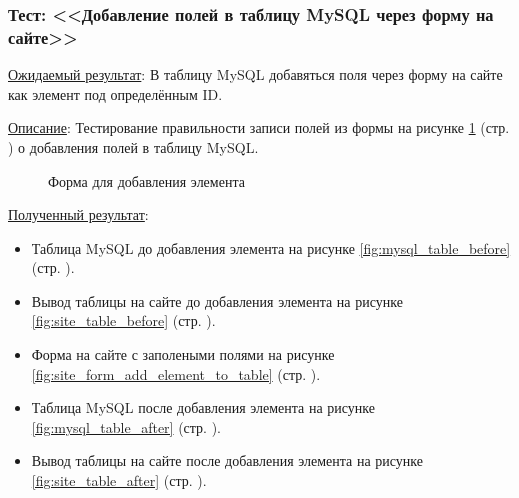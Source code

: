 \subsubsection*{\textbf{Тест}: <<Добавление полей в таблицу MySQL через форму на сайте>>}

\underline{Ожидаемый результат}:
В таблицу MySQL добавяться поля через форму на сайте как элемент под определённым ID.

\underline{Описание}:
Тестирование правильности записи полей из формы
на рисунке \ref{fig:site_form}
(стр. \pageref{fig:site_form})
о добавления полей в таблицу MySQL.

\begin{figure}[p]
    \caption{Форма для добавления элемента}
    \label{fig:site_form}
\end{figure}

\underline{Полученный результат}:

\begin{itemize}
    \item Таблица MySQL до добавления элемента
    на рисунке \ref{fig:mysql_table_before}
    (стр. \pageref{fig:mysql_table_before}).

    \item Вывод таблицы на сайте до добавления элемента
    на рисунке \ref{fig:site_table_before}
    (стр. \pageref{fig:site_table_before}).

    \item Форма на сайте с заполеными полями
    на рисунке \ref{fig:site_form_add_element_to_table}
    (стр. \pageref{fig:site_form_add_element_to_table}).

    \item Таблица MySQL после добавления элемента
    на рисунке \ref{fig:mysql_table_after}
    (стр. \pageref{fig:mysql_table_after}).

    \item Вывод таблицы на сайте после добавления элемента
    на рисунке \ref{fig:site_table_after}
    (стр. \pageref{fig:site_table_after}).
\end{itemize}

